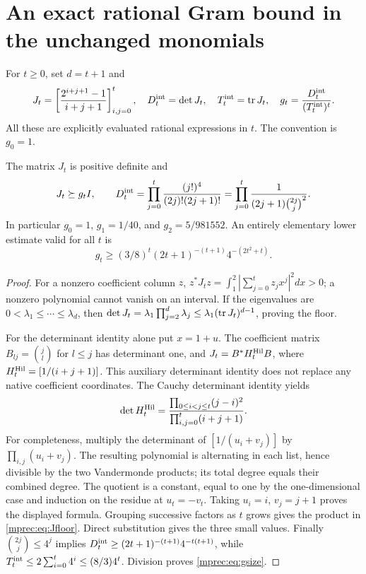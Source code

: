 \documentclass[11pt]{article}
\begin{document}
\section{An exact rational Gram bound in the unchanged monomials}

For $t\ge0$, set $d=t+1$ and
\begin{equation}\label{mprec:eq:J}
 J_t=\left[\frac{2^{i+j+1}-1}{i+j+1}\right]_{i,j=0}^t,
 \quad D_t^{\rm int}=\det J_t,
 \quad T_t^{\rm int}=\operatorname{tr} J_t,
 \quad g_t=\frac{D_t^{\rm int}}{(T_t^{\rm int})^t}.
\end{equation}
All these are explicitly evaluated rational expressions in $t$.
The convention is $g_0=1$.

\begin{mpreclemma}\label{mprec:lem:J}
The matrix $J_t$ is positive definite and
\begin{equation}\label{mprec:eq:Jfloor}
 J_t\succeq g_tI,\qquad
 D_t^{\rm int}=\prod_{j=0}^t
 \frac{(j!)^4}{(2j)!(2j+1)!}
 =\prod_{j=0}^t\frac1{(2j+1)\binom{2j}j^2}.
\end{equation}
In particular $g_0=1$, $g_1=1/40$, and $g_2=5/981552$.
An entirely elementary lower estimate valid for all $t$ is
\begin{equation}\label{mprec:eq:gsize}
 g_t\ge(3/8)^t(2t+1)^{-(t+1)}4^{-(2t^2+t)}.
\end{equation}
\end{mpreclemma}
\begin{proof}
For a nonzero coefficient column $z$,
$z^*J_tz=\int_1^2|\sum_{j=0}^tz_jx^j|^2dx>0$;
a nonzero polynomial cannot vanish on an interval. If the eigenvalues
are $0<\lambda_1\le\cdots\le\lambda_d$, then
$\det J_t=\lambda_1\prod_{j=2}^d\lambda_j
\le\lambda_1(\operatorname{tr} J_t)^{d-1}$, proving the floor.

For the determinant identity alone put $x=1+u$. The coefficient
matrix $B_{lj}=\binom jl$ for $l\le j$ has determinant one, and
$J_t=B^*H_t^{\rm Hil}B$, where
$H_t^{\rm Hil}=[1/(i+j+1)]$. This auxiliary determinant identity
does not replace any native coefficient coordinates. The Cauchy
determinant identity yields
\[
 \det H_t^{\rm Hil}
 =\frac{\prod_{0\le i<j\le t}(j-i)^2}
 {\prod_{i,j=0}^t(i+j+1)}.
\]
For completeness, multiply the determinant of $[1/(u_i+v_j)]$
by $\prod_{i,j}(u_i+v_j)$. The resulting polynomial is alternating
in each list, hence divisible by the two Vandermonde products;
its total degree equals their combined degree. The quotient is a
constant, equal to one by the one-dimensional case and induction
on the residue at $u_t=-v_t$. Taking $u_i=i$, $v_j=j+1$ proves
the displayed formula. Grouping successive factors as $t$ grows
gives the product in \eqref{mprec:eq:Jfloor}. Direct substitution gives
the three small values. Finally $\binom{2j}j\le4^j$ implies
$D_t^{\rm int}\ge(2t+1)^{-(t+1)}4^{-t(t+1)}$, while
$T_t^{\rm int}\le2\sum_{i=0}^t4^i\le(8/3)4^t$.
Division proves \eqref{mprec:eq:gsize}.
\end{proof}
\end{document}

